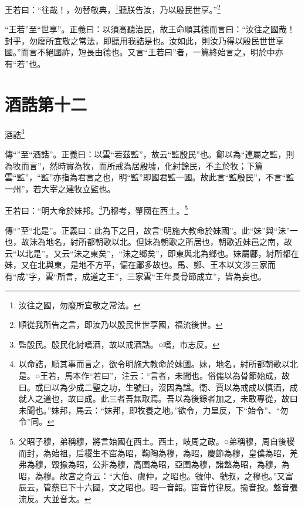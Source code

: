 王若曰：“往哉！，勿替敬典，\footnote{汝往之國，勿廢所宜敬之常法。}聽朕告汝，乃以殷民世享。”\footnote{順從我所告之言，即汝乃以殷民世世享國，福流後世。}

{\noindent\shu{}\fzkt “王若”至“世享”。正義曰：以須高聽治民，故王命順其德而言曰：“汝往之國哉！封乎，勿廢所宜敬之常法，即聽用我誥是也。汝如此，則汝乃得以殷民世世享國。”而言不絕國祚，短長由德也。又言“王若曰”者，一篇終始言之，明於中亦有“若”也。 \par}

\section{酒誥第十二}


酒誥\footnote{監殷民。殷民化紂嗜酒，故以戒酒誥。○嗜，巿志反。}

{\noindent\shu{}\fzkt 傳“”至“酒誥”。正義曰：以雲“若茲監”，故云“監殷民”也。鄭以為“連屬之監，則為牧而言”，然時實為牧，而所戒為居殷墟，化紂餘民，不主於牧；下篇雲“監”，“監”亦指為君言之也，明“監”即國君監一國。故此言“監殷民”，不言“監一州”，若大宰之建牧立監也。 \par}

王若曰：“明大命於妹邦。\footnote{以命誥，順其事而言之，欲令明施大教命於妹國。妹，地名，紂所都朝歌以北是。○王若，馬本作“若曰”，注云：“言者，未聞也。俗儒以為骨節始成，故曰。或曰以為少成二聖之功，生號曰，沒因為諡。衛、賈以為戒成以慎酒，成就人之道也，故曰成。此三者吾無取焉。吾以為後錄者加之，未敢專從，故曰未聞也。”妹邦，馬云：“妹邦，即牧養之地。”欲令，力呈反，下“始令”、“勿令”同。}乃穆考，肇國在西土。\footnote{父昭子穆，弟稱穆，將言始國在西土。西土，岐周之政。○弟稱穆，周自後稷而封，為始祖，后稷生不窋為昭，鞠陶為穆，為昭，慶節為穆，皇僕為昭，羌弗為穆，毀揄為昭，公非為穆，高圉為昭，亞圉為穆，諸盩為昭，為穆，為昭，為穆。故宮之奇云：“大伯、虞仲，之昭也。虢仲、虢叔，之穆也。”又富辰云，管蔡已下十六國，文之昭也。昭一音韶。窋音竹律反。揄音投。盩音張流反。大並音太。}


{\noindent\zhuan{}\fzbyks 傳“”至“北是”。正義曰：此為下之目，故言“明施大教命於妹國”。此“妹”與“沬”一也，故沬為地名，紂所都朝歌以北。但妹為朝歌之所居也，朝歌近妹邑之南，故云“以北是”。又云“沬之東矣”，“沬之鄉矣”，即東與北為鄉也。妹屬鄘，紂所都在妹，又在北與東，是地不方平，偏在鄘多故也。馬、鄭、王本以文涉三家而有“成”字，雲“所言，成道之王”，三家雲“王年長骨節成立”，皆為妄也。 \par}

